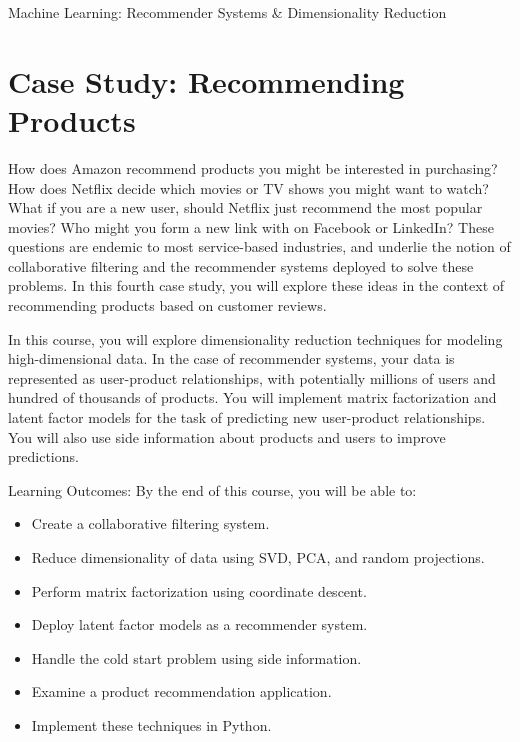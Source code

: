 Machine Learning: Recommender Systems & Dimensionality Reduction


\section{Case Study: Recommending Products}

How does Amazon recommend products you might be interested in purchasing?  How does Netflix decide which movies or TV shows you might want to watch?  What if you are a new user, should Netflix just recommend the most popular movies?  Who might you form a new link with on Facebook or LinkedIn?  These questions are endemic to most service-based industries, and underlie the notion of collaborative filtering and the recommender systems deployed to solve these problems.  In this fourth case study, you will explore these ideas in the context of recommending products based on customer reviews.  

In this course, you will explore dimensionality reduction techniques for modeling high-dimensional data.  In the case of recommender systems, your data is represented as user-product relationships, with potentially millions of users and hundred of thousands of products.  You will implement matrix factorization and latent factor models for the task of predicting new user-product relationships.  You will also use side information about products and users to improve predictions.

Learning Outcomes:  By the end of this course, you will be able to:
\begin{itemize}
\item Create a collaborative filtering system.
\item Reduce dimensionality of data using SVD, PCA, and random projections.
\item Perform matrix factorization using coordinate descent.
\item Deploy latent factor models as a recommender system.
\item Handle the cold start problem using side information.
\item Examine a product recommendation application.
\item Implement these techniques in Python.
\end{itemize}
